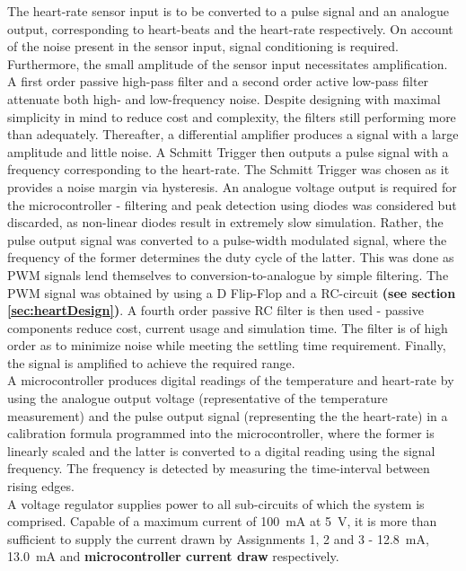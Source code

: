 
The heart-rate sensor input is to be converted to a pulse signal and an analogue output, corresponding to heart-beats and the heart-rate respectively. On account of the noise present in the sensor input, signal conditioning  is required. Furthermore, the small amplitude of the sensor input necessitates amplification. A first order passive high-pass filter and a second order active low-pass filter attenuate both high- and low-frequency noise. Despite designing with maximal simplicity in mind to reduce cost and complexity, the filters still performing more than adequately. Thereafter, a differential amplifier produces a signal with a large amplitude and little noise. A Schmitt Trigger then outputs a pulse signal with a frequency corresponding to the heart-rate. The Schmitt Trigger was chosen as it provides a noise margin via hysteresis. An analogue voltage output is required for the microcontroller - filtering and peak detection using diodes was considered but discarded, as non-linear diodes result in extremely slow simulation. Rather, the pulse output signal was converted to a pulse-width modulated signal, where the frequency of the former determines the duty cycle of the latter. This was done as PWM signals lend themselves to conversion-to-analogue by simple filtering. The PWM signal was obtained by using a D Flip-Flop and a RC-circuit \textbf{(see section \ref{sec:heartDesign})}. A fourth order passive RC filter is then used - passive components reduce cost, current usage and simulation time. The filter is of high order as to minimize noise while meeting the settling time requirement. Finally, the signal is amplified to achieve the required range.\\

A microcontroller produces digital readings of the temperature and heart-rate by using the analogue output voltage (representative of the temperature measurement) and the pulse output signal (representing the the heart-rate) in a calibration formula programmed into the microcontroller, where the former is linearly scaled and the latter is converted to a digital reading using the signal frequency. The frequency is detected by measuring the time-interval between rising edges.\\

A voltage regulator supplies power to all sub-circuits of which the system is comprised. Capable of a maximum current of \SI{100}{mA} at \SI{5}{V}, it is more than sufficient to supply the current drawn by Assignments 1, 2 and 3 -  \SI{12.8}{mA}, \SI{13.0}{mA} and \textbf{microcontroller current draw} respectively.

\vfill









